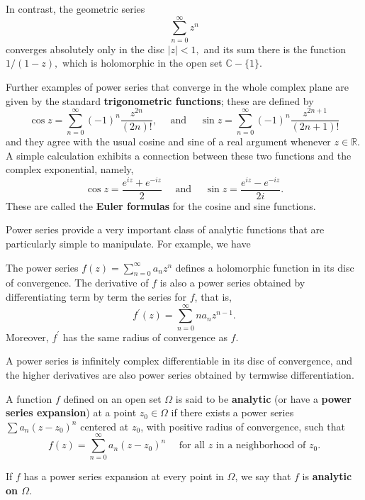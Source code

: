 \documentclass{chapter}
\begin{document}
            \begin{example}
                In contrast, the geometric series \[\sum_{n=0}^{\infty} z^{n}\] converges absolutely only in the disc $|z|<1,$ and its sum there is the function $1 /(1-z),$ which is holomorphic in the open set $\mathbb{C}-\{1\}.$ 
            \end{example}

            \begin{example}
                Further examples of power series that converge in the whole complex plane are given by the standard \textbf{trigonometric functions}; these are defined by \[\cos z=\sum_{n=0}^{\infty}(-1)^{n} \frac{z^{2 n}}{(2 n) !}, \quad \text { and } \quad \sin z=\sum_{n=0}^{\infty}(-1)^{n} \frac{z^{2 n+1}}{(2 n+1) !}\] and they agree with the usual cosine and sine of a real argument whenever $z \in \mathbb{R} .$ A simple calculation exhibits a connection between these two functions and the complex exponential, namely, \[\cos z=\frac{e^{i z}+e^{-i z}}{2} \quad \text { and } \quad \sin z=\frac{e^{i z}-e^{-i z}}{2 i}.\] These are called the \textbf{Euler formulas} for the cosine and sine functions.
            \end{example}

            \bigskip
            Power series provide a very important class of analytic functions that are particularly simple to manipulate. For example, we have

            \begin{theorem}
                The power series $f(z)=\sum_{n=0}^{\infty} a_{n} z^{n}$ defines a holomorphic function in its disc of convergence. The derivative of $f$ is also a power series obtained by differentiating term by term the series for $f$, that is, \[f^{\prime}(z)=\sum_{n=0}^{\infty} n a_{n} z^{n-1}.\] Moreover, $f^{\prime}$ has the same radius of convergence as $f$.
                \label{theorem: analytic to holomorphic}
            \end{theorem}
            \begin{corollary}
                A power series is infinitely complex differentiable in its disc of convergence, and the higher derivatives are also power series obtained by termwise differentiation.
            \end{corollary}

            \begin{definition}[analytic]
                A function $f$ defined on an open set $\Omega$ is said to be \textbf{analytic} (or have a \textbf{power series expansion}) at a point $z_{0} \in \Omega$ if there exists a power series $\sum a_{n}\left(z-z_{0}\right)^{n}$ centered at $z_{0}$, with positive radius of convergence, such that \[f(z)=\sum_{n=0}^{\infty} a_{n}\left(z-z_{0}\right)^{n} \quad \text { for all } z \text { in a neighborhood of } z_{0}.\]

                If $f$ has a power series expansion at every point in $\Omega$, we say that $f$ is \textbf{analytic on $\Omega$}.
            \end{definition}
            
\end{document}
